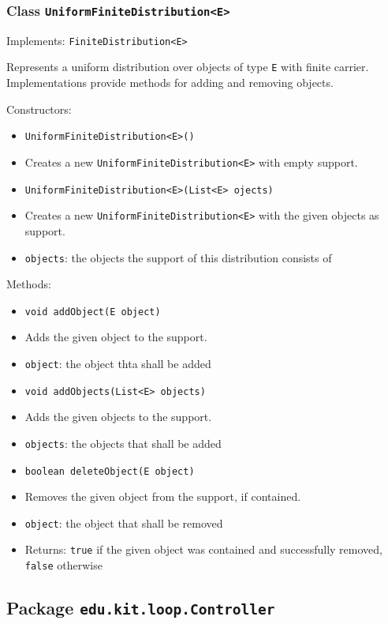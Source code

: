 \documentclass[parskip=full,11pt]{scrartcl}
\begin{document}
\subsubsection{Class \texttt{UniformFiniteDistribution<E>}}
Implements: \texttt{FiniteDistribution<E>}

Represents a uniform distribution over objects of type \texttt{E} with finite carrier. Implementations provide methods for adding and removing objects.

Constructors:
\begin{itemize}\itemsep -10pt
\item \texttt{UniformFiniteDistribution<E>()}
\item[] Creates a new \texttt{UniformFiniteDistribution<E>} with empty support.

\item \texttt{UniformFiniteDistribution<E>(List<E> ojects)}
\item[] Creates a new \texttt{UniformFiniteDistribution<E>} with the given objects as support.
\item[] \texttt{objects}: the objects the support of this distribution consists of
\end{itemize}

Methods:
\begin{itemize}\itemsep -10pt
\item \texttt{void addObject(E object)}
\item[] Adds the given object to the support.
\item[] \texttt{object}: the object thta shall be added

\item \texttt{void addObjects(List<E> objects)}
\item[] Adds the given objects to the support.
\item[] \texttt{objects}: the objects that shall be added

\item \texttt{boolean deleteObject(E object)}
\item[] Removes the given object from the support, if contained.
\item[] \texttt{object}: the object that shall be removed
\item[] Returns: \texttt{true} if the given object was contained and successfully removed, \texttt{false} otherwise
\end{itemize}

\subsection{Package \texttt{edu.kit.loop.Controller}}
\end{document}
